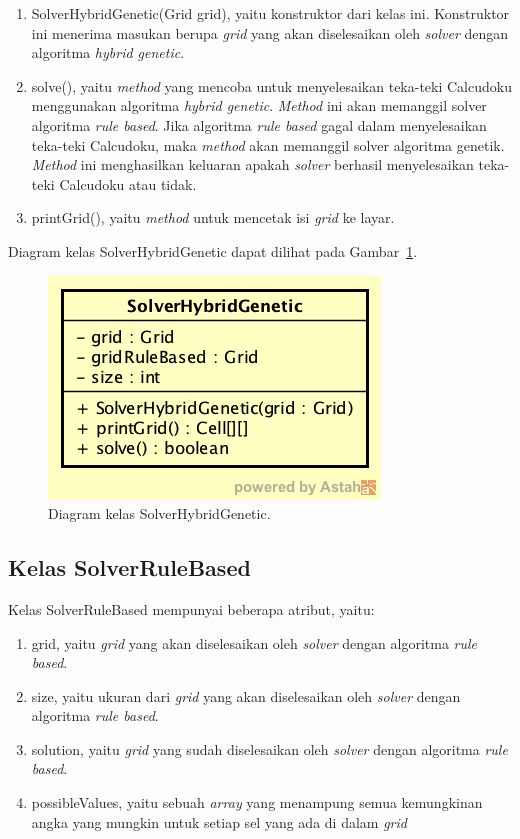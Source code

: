 \begin{enumerate}
\item SolverHybridGenetic(Grid grid), yaitu konstruktor dari kelas ini. Konstruktor ini menerima masukan berupa \textit{grid} yang akan diselesaikan oleh \textit{solver} dengan algoritma \textit{hybrid genetic}.
\item solve(), yaitu \textit{method} yang mencoba untuk menyelesaikan teka-teki Calcudoku menggunakan algoritma \textit{hybrid genetic}. \textit{Method} ini akan memanggil solver algoritma \textit{rule based}. Jika algoritma \textit{rule based} gagal dalam menyelesaikan teka-teki Calcudoku, maka \textit{method} akan memanggil solver algoritma genetik. \textit{Method} ini menghasilkan keluaran apakah \textit{solver} berhasil menyelesaikan teka-teki Calcudoku atau tidak.
\item printGrid(), yaitu \textit{method} untuk mencetak isi \textit{grid} ke layar.
\end{enumerate}

Diagram kelas SolverHybridGenetic dapat dilihat pada Gambar~\ref{fig:diagramkelassolverhg}.

\begin{figure}
\centering
\captionsetup{justification=centering}
\includegraphics[scale=0.5]{Gambar/Perancangan/DiagramKelasSolverHybridGenetic.png}
\caption[Diagram kelas SolverHybridGenetic.]{Diagram kelas SolverHybridGenetic.}
\label{fig:diagramkelassolverhg}
\end{figure}

\subsection{Kelas SolverRuleBased}
\label{sec:kelassolverrb}

Kelas SolverRuleBased mempunyai beberapa atribut, yaitu:

\begin{enumerate}
\item grid, yaitu \textit{grid} yang akan diselesaikan oleh \textit{solver} dengan algoritma \textit{rule based}.
\item size, yaitu ukuran dari \textit{grid} yang akan diselesaikan oleh \textit{solver} dengan algoritma \textit{rule based}.
\item solution, yaitu \textit{grid} yang sudah diselesaikan oleh \textit{solver} dengan algoritma \textit{rule based}.
\item possibleValues, yaitu sebuah \textit{array} yang menampung semua kemungkinan angka yang mungkin untuk setiap sel yang ada di dalam \textit{grid}
\end{enumerate}

